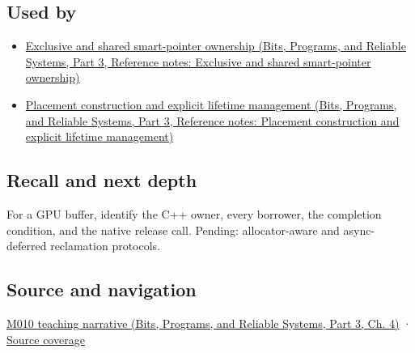 \subsection{Used by}\label{appendix-69739d3ab49b-used-by}

\hypertarget{appendix-69739d3ab49b-used-by}{}

\begin{itemize}
\tightlist
\item
  \href{../01-Bits-Programs-and-Reliable-Systems-P03/main.pdf\#nameddest=appendix-51602cabe815}{Exclusive and shared smart-pointer ownership (Bits, Programs, and Reliable Systems, Part 3, Reference notes: Exclusive and shared smart-pointer ownership)}
\item
  \href{../01-Bits-Programs-and-Reliable-Systems-P03/main.pdf\#nameddest=appendix-f56c3e43fd4e}{Placement construction and explicit lifetime management (Bits, Programs, and Reliable Systems, Part 3, Reference notes: Placement construction and explicit lifetime management)}
\end{itemize}

\subsection{Recall and next depth}\label{appendix-69739d3ab49b-recall-and-next-depth}

\hypertarget{appendix-69739d3ab49b-recall-and-next-depth}{}

For a GPU buffer, identify the C++ owner, every borrower, the completion condition, and the native release call. Pending: allocator-aware and async-deferred reclamation protocols.

\subsection{Source and navigation}\label{appendix-69739d3ab49b-source-and-navigation}

\hypertarget{appendix-69739d3ab49b-source-and-navigation}{}

\href{../01-Bits-Programs-and-Reliable-Systems-P03/main.pdf\#nameddest=01-foundations-i-ch004-from-a-live-object-to-responsible-resource-ownership}{M010 teaching narrative (Bits, Programs, and Reliable Systems, Part 3, Ch. 4)} · \hyperref[appendix-fd090d982a15-m010---parts-148-160]{Source coverage}
